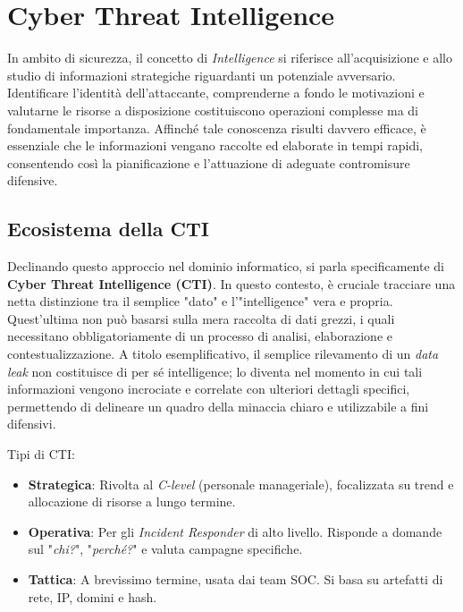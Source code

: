 \chapter{Cyber Threat Intelligence}

In ambito di sicurezza, il concetto di \textit{Intelligence} si riferisce all'acquisizione 
e allo studio di informazioni strategiche riguardanti un potenziale avversario. 
Identificare l'identità dell'attaccante, comprenderne a fondo le motivazioni e 
valutarne le risorse a disposizione costituiscono operazioni complesse ma di 
fondamentale importanza. Affinché tale conoscenza risulti davvero efficace, è 
essenziale che le informazioni vengano raccolte ed elaborate in tempi rapidi, 
consentendo così la pianificazione e l'attuazione di adeguate contromisure difensive.

\section{Ecosistema della CTI}

Declinando questo approccio nel dominio informatico, si parla specificamente di 
\textbf{Cyber Threat Intelligence (CTI)}. In questo contesto, è cruciale tracciare 
una netta distinzione tra il semplice "dato" e l'"intelligence" vera e propria. 
Quest'ultima non può basarsi sulla mera raccolta di dati grezzi, i quali necessitano 
obbligatoriamente di un processo di analisi, elaborazione e contestualizzazione. A 
titolo esemplificativo, il semplice rilevamento di un \textit{data leak} non 
costituisce di per sé intelligence; lo diventa nel momento in cui tali informazioni 
vengono incrociate e correlate con ulteriori dettagli specifici, permettendo di 
delineare un quadro della minaccia chiaro e utilizzabile a fini difensivi.

Tipi di CTI:

\begin{itemize}
    \item \textbf{Strategica}: Rivolta al \textit{C-level} (personale manageriale), 
    focalizzata su trend e allocazione di risorse a lungo termine.
    \item \textbf{Operativa}: Per gli \textit{Incident Responder} di alto livello. Risponde a
    domande sul "\textit{chi?}", "\textit{perché?}" e valuta campagne specifiche.
    \item \textbf{Tattica}: A brevissimo termine, usata dai team SOC. Si basa su 
    artefatti di rete, IP, domini e hash.
\end{itemize}

